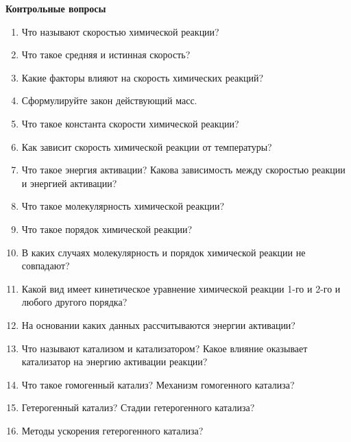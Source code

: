 \textbf{Контрольные вопросы}
\begin{enumerate}
\item Что называют скоростью химической реакции?
\item Что такое средняя и истинная скорость?
\item Какие факторы влияют на скорость химических реакций?
\item Сформулируйте закон действующий масс.
\item Что такое константа скорости химической реакции? 
\item Как зависит скорость химической реакции от температуры?
\item Что такое энергия активации? Какова зависимость между скоростью реакции и энергией активации?
\item Что такое молекулярность химической реакции?
\item Что такое порядок химической реакции?
\item В каких случаях молекулярность и порядок химической реакции не совпадают?
\item Какой вид имеет кинетическое уравнение химической реакции 1-го и 2-го и любого другого порядка?
\item На основании каких данных рассчитываются энергии активации?
\item Что называют катализом и катализатором? Какое влияние оказывает катализатор на энергию активации реакции?
\item Что такое гомогенный катализ? Механизм гомогенного катализа?
\item Гетерогенный катализ? Стадии гетерогенного катализа?
\item Методы ускорения гетерогенного катализа?
\end{enumerate}

